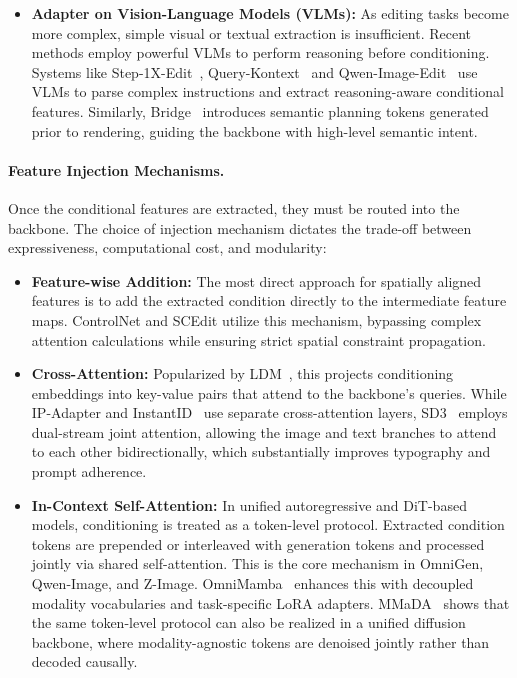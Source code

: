 \begin{itemize}
    \item \textbf{Adapter on Vision-Language Models (VLMs):} As editing tasks become more complex, simple visual or textual extraction is insufficient. Recent methods employ powerful VLMs to perform reasoning before conditioning. Systems like Step-1X-Edit~\citep{liu2025step1xedit}, Query-Kontext~\citep{song2025query} and Qwen-Image-Edit~\citep{wu2025qwen} use VLMs to parse complex instructions and extract reasoning-aware conditional features. Similarly, Bridge~\citep{wang2025bridge} introduces semantic planning tokens generated prior to rendering, guiding the backbone with high-level semantic intent.
\end{itemize}

\paragraph{Feature Injection Mechanisms.}
Once the conditional features are extracted, they must be routed into the backbone. The choice of injection mechanism dictates the trade-off between expressiveness, computational cost, and modularity:
\begin{itemize}
    \item \textbf{Feature-wise Addition:} The most direct approach for spatially aligned features is to add the extracted condition directly to the intermediate feature maps. ControlNet and SCEdit utilize this mechanism, bypassing complex attention calculations while ensuring strict spatial constraint propagation.
    \item \textbf{Cross-Attention:} Popularized by LDM~\citep{rombach2022stablediffusion}, this projects conditioning embeddings into key-value pairs that attend to the backbone's queries. While IP-Adapter and InstantID~\citep{wang2024instantid} use separate cross-attention layers, SD3~\citep{esser2024stablediffusion3} employs dual-stream joint attention, allowing the image and text branches to attend to each other bidirectionally, which substantially improves typography and prompt adherence.
    \item \textbf{In-Context Self-Attention:} In unified autoregressive and DiT-based models, conditioning is treated as a token-level protocol. Extracted condition tokens are prepended or interleaved with generation tokens and processed jointly via shared self-attention. This is the core mechanism in OmniGen, Qwen-Image, and Z-Image. OmniMamba~\citep{zou2025omnimamba} enhances this with decoupled modality vocabularies and task-specific LoRA adapters. MMaDA~\citep{yang2025mmada} shows that the same token-level protocol can also be realized in a unified diffusion backbone, where modality-agnostic tokens are denoised jointly rather than decoded causally.
\end{itemize}

